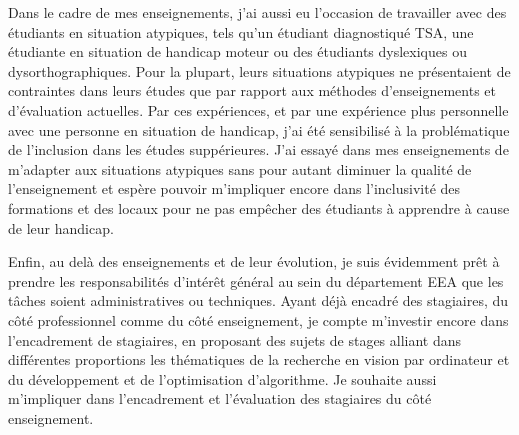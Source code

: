 Dans le cadre de mes enseignements, j'ai aussi eu l'occasion de travailler avec des étudiants en situation atypiques, tels qu'un étudiant diagnostiqué TSA, une étudiante en situation de handicap moteur ou des étudiants dyslexiques ou dysorthographiques. Pour la plupart, leurs situations atypiques ne présentaient de contraintes dans leurs études que par rapport aux méthodes d'enseignements et d'évaluation actuelles. Par ces expériences, et par une expérience plus personnelle avec une personne en situation de handicap, j'ai été sensibilisé à la problématique de l'inclusion dans les études suppérieures. J'ai essayé dans mes enseignements de m'adapter aux situations atypiques sans pour autant diminuer la qualité de l'enseignement et espère pouvoir m'impliquer encore dans l'inclusivité des formations et des locaux pour ne pas empêcher des étudiants à apprendre à cause de leur handicap.

Enfin, au delà des enseignements et de leur évolution, je suis évidemment prêt à prendre les responsabilités d'intérêt général au sein du département EEA que les tâches soient administratives ou techniques. Ayant déjà encadré des stagiaires, du côté professionnel comme du côté enseignement, je compte m'investir encore dans l'encadrement de stagiaires, en proposant des sujets de stages alliant dans différentes proportions les thématiques de la recherche en vision par ordinateur et du développement et de l'optimisation d'algorithme. Je souhaite aussi m'impliquer dans l'encadrement et l'évaluation des stagiaires du côté enseignement.
